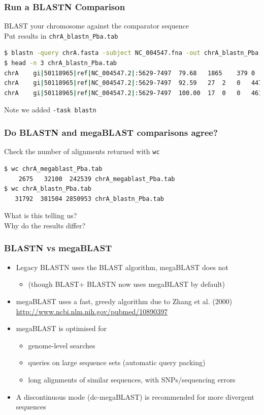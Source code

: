 \documentclass[table]{beamer}
\begin{document}
  \begin{frame}[fragile]
    \frametitle{Run a BLASTN Comparison}
    BLAST your chromosome against the comparator sequence \\
    Put results in \texttt{chrA\_blastn\_Pba.tab}
\begin{lstlisting}[language=bash]
$ blastn -query chrA.fasta -subject NC_004547.fna -out chrA_blastn_Pba.tab -outfmt 6 -task blastn
$ head -n 3 chrA_blastn_Pba.tab 
chrA	gi|50118965|ref|NC_004547.2|:5629-7497	79.68	1865	379	0	4584915	4586779	1865	1	0.0	1654
chrA	gi|50118965|ref|NC_004547.2|:5629-7497	92.59	27	2	0	4479367	4479393	1254	1280	0.004	41.0
chrA	gi|50118965|ref|NC_004547.2|:5629-7497	100.00	17	0	0	4613022	4613038	52	36	2.1	31.9
\end{lstlisting}
Note we added \texttt{-task blastn}
\end{frame}
    
  \begin{frame}[fragile]
    \frametitle{Do BLASTN and megaBLAST comparisons agree?}
    Check the number of alignments returned with \texttt{wc}
\begin{lstlisting}[language=bash]
$ wc chrA_megablast_Pba.tab 
    2675   32100  242539 chrA_megablast_Pba.tab
$ wc chrA_blastn_Pba.tab
   31792  381504 2850953 chrA_blastn_Pba.tab
\end{lstlisting}
    What is this telling us? \\
    Why do the results differ?
\end{frame}

  \begin{frame}
    \frametitle{BLASTN vs megaBLAST}
    \begin{itemize}
      \item<1-> Legacy BLASTN uses the BLAST algorithm, megaBLAST does not
      \begin{itemize}
        \item (though BLAST+ BLASTN now uses megaBLAST by default)
      \end{itemize}      
      \item<1-> megaBLAST uses a fast, greedy algorithm due to Zhang et al. (2000) \url{http://www.ncbi.nlm.nih.gov/pubmed/10890397}
      \item<2-> megaBLAST is optimised for
      \begin{itemize}
        \item genome-level searches
        \item queries on large sequence sets (automatic query packing)
        \item long alignments of similar sequences, with SNPs/sequencing errors
      \end{itemize}
      \item<2-> A discontinuous mode (dc-megaBLAST) is recommended for more divergent sequences
    \end{itemize}
\end{frame}
\end{document}
